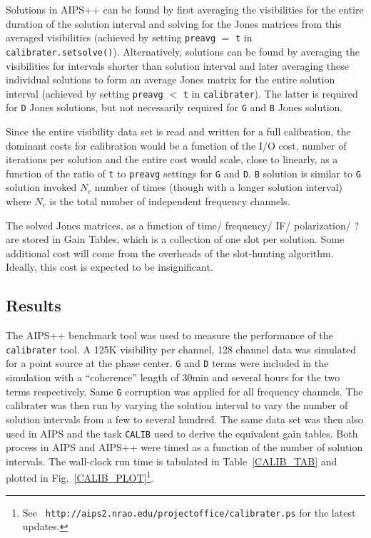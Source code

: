 Solutions in AIPS++ can be found by first averaging the visibilities
for the entire duration of the solution interval and solving for the
Jones matrices from this averaged visibilities (achieved by setting
{\tt preavg} $=$ {\tt t} in {\tt calibrater.setsolve()}).
Alternatively, solutions can be found by averaging the visibilities
for intervals shorter than solution interval and later averaging these
individual solutions to form an average Jones matrix for the entire
solution interval (achieved by setting {\tt preavg} $<$ {\tt t} in
{\tt calibrater}).  The latter is required for {\tt D} Jones
solutions, but not necessarily required for {\tt G} and {\tt B} Jones
solution.

Since the entire visibility data set is read and written for a full
calibration, the dominant costs for calibration would be a function of
the I/O cost, number of iterations per solution and the entire cost
would scale, close to linearly, as a function of the ratio of {\tt t}
to {\tt preavg} settings for {\tt G} and {\tt D}.  {\tt B} solution is
similar to {\tt G} solution invoked $N_c$ number of times (though with
a longer solution interval) where $N_c$ is the total number of
independent frequency channels.

The solved Jones matrices, as a function of time/ frequency/ IF/
polarization/ ? are stored in Gain Tables, which is a collection of
one slot per solution.  Some additional cost will come from the
overheads of the slot-hunting algorithm.  Ideally, this cost is
expected to be insignificant.

\subsection{Results}

The AIPS++ benchmark tool was used to measure the performance of the
{\tt calibrater} tool.  A 125K visibility per channel, 128 channel
data was simulated for a point source at the phase center.  {\tt G}
and {\tt D} terms were included in the simulation with a ``coherence''
length of 30min and several hours for the two terms respectively.
Same {\tt G} corruption was applied for all frequency channels.  The
calibrater was then run by varying the solution interval to vary the
number of solution intervals from a few to several hundred.  The same
data set was then also used in AIPS and the task {\tt CALIB} used to
derive the equivalent gain tables.  Both process in AIPS and AIPS++
were timed as a function of the number of solution intervals.  The
wall-clock run time is tabulated in Table~\ref{CALIB_TAB} and plotted
in Fig.~\ref{CALIB_PLOT}\footnote{See {\tt
http://aips2.nrao.edu/projectoffice/calibrater.ps} for the latest
updates.}.

